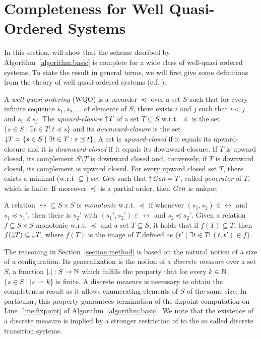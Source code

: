 \section{Completeness for Well Quasi-Ordered Systems}\label{section:completeness}
%
In this section, will show that the scheme desribed by Algorithm~\ref{algorithm:basic}
%
is complete for a wide class of well-quasi ordered systems.
%
%
%
To state the result in general terms, we will first give some
definitions from the theory of well quasi-ordered systems
(c.f. \cite{abdulla:well}).

A \emph{well quasi-ordering} (WQO) is a preorder $\preceq$ over a set
$S$ such that for every infinite sequence $s_1,s_2,\ldots$ of elements
of $S$, there exists $i$ and $j$ such that $i<j$ and $s_i\preceq s_j$. 
%
The \emph{upward-closure} ${\uparrow} T$ of a set $T\subseteq S$ w.r.t. $\preceq$ is the
set $\{s\in S\mid \exists t\in T:t\preceq s\}$ and its 
\emph{downward-closure} is the set ${\downarrow} T = \{s\in S\mid \exists t\in T:s\preceq t\}$.
%
A set is \emph{upward-closed} if it equals its upward-closure and it is \emph{downward-closed} if it equals its downward-closure.
%
If $T$ is upward closed, 
%
its complement $S\setminus T$ is downward closed and, conversely, 
%
if $T$ is downward closed, its complement is upward closed. 
%
For every upward closed set $T$, there exists a minimal (w.r.t $\subseteq$) set $\emph{Gen}$ such that ${\uparrow}\emph{Gen} = T$, 
%
called \emph{generator} of $T$, 
%
which is finite.
%
If moreover $\preceq$ is a partial order, 
%
then $\emph{Gen}$ is unique. 



A relation $\rel\subseteq S\times S$ is \emph{monotonic} w.r.t. $\preceq$ if whenever
$(s_1,s_2)\in\rel$ and $s_1\preceq s_1'$, then there is $s_2'$ with
$(s_1',s_2')\in\rel$ and $s_2\preceq s_2'$.  
%
Given a relation $f\subseteq S\times S$ monotonic w.r.t. $\preceq$ 
%
and a set $T\subseteq S$, 
%
it holds that if $f(T)\subseteq T$, 
%
then $f({\downarrow} T)\subseteq {\downarrow} T$, 
%
where $f(T)$ is the image of $T$ 
%
defined as $\{t'\mid\exists t\in T:(t,t')\in f\}$.




The reasoning in Section~\ref{section:method} is based on the natural
notion of a size of a configuration.  Its generalization is the notion
of a \emph{discrete measure} over a set $S$, a function
$|.|:S\rightarrow\mathbb N$ which fulfills the property that for every
$k\in\mathbb N$, $\{s\in S\mid|s| = k\}$ is finite.
%
A discrete measure is necessary to obtain the completeness result as
it allows enumerating elements of $S$ of the same size.
%
In particular, this property guarantees termination of the fixpoint
computation on Line~\ref{line:fixpoint} of
Algorithm~\ref{algorithm:basic}.
%
We note that the existence of a discrete measure is implied by a
stronger restriction of \cite{Bingham:empirically} to the so called
discrete transition systems.
%

